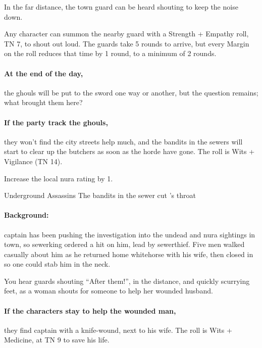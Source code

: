 \begin{multicols}{2}
\begin{boxtext}
  In the far distance, the town guard can be heard shouting to keep the noise down.

\end{boxtext}

Any character can summon the nearby guard with a Strength + Empathy roll, TN 7, to shout out loud.
The guards take 5 rounds to arrive, but every Margin on the roll reduces that time by 1 round, to a minimum of 2 rounds.


\paragraph{At the end of the day,}
the ghouls will be put to the sword one way or another, but the question remains; what brought them here?

\paragraph{If the party track the ghouls,}
they won't find the city streets help much, and the bandits in the sewers will start to clear up the butchers as soon as the horde have gone.
The roll is Wits + Vigilance (TN 14).

Increase the local nura rating by 1.

{\N Underground Assassins}%
{The bandits in the sewer cut 's throat}%

\paragraph{Background:}
\Gls{captain} has been pushing the investigation into the undead and nura sightings in town, so \gls{sewerking} ordered a hit on him, lead by \gls{sewerthief}.
Five men walked casually about him as he returned home \gls{whitehorse} with his wife, then closed in so one could stab him in the neck.

\begin{boxtext}

  You hear guards shouting ``After them!'', in the distance, and quickly scurrying feet, as a woman shouts for someone to help her wounded husband.

\end{boxtext}

\paragraph{If the characters stay to help the wounded man,}
they find \gls{captain} with a knife-wound, next to his wife.
The roll is Wits + Medicine, at TN 9 to save his life.


\end{multicols}
